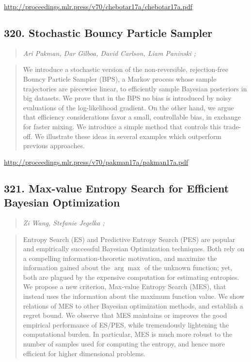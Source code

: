 \documentclass{article}
\begin{document}
\href{http://proceedings.mlr.press/v70/chebotar17a/chebotar17a.pdf}{http://proceedings.mlr.press/v70/chebotar17a/chebotar17a.pdf}

\subsection{320. Stochastic Bouncy Particle Sampler}

\begin{quote}
\footnotesize{\textit{Ari Pakman, Dar Gilboa, David Carlson, Liam Paninski ;}}

\end{quote}

\begin{quote}
    We introduce a stochastic version of the non-reversible, rejection-free Bouncy Particle Sampler (BPS), a Markov process whose sample trajectories are piecewise linear, to efficiently sample Bayesian posteriors in big datasets. We prove that in the BPS no bias is introduced by noisy evaluations of the log-likelihood gradient. On the other hand, we argue that efficiency considerations favor a small, controllable bias, in exchange for faster mixing. We introduce a simple method that controls this trade-off. We illustrate these ideas in several examples which outperform previous approaches.  
\end{quote}

\href{http://proceedings.mlr.press/v70/pakman17a/pakman17a.pdf}{http://proceedings.mlr.press/v70/pakman17a/pakman17a.pdf}

\subsection{321. Max-value Entropy Search for Efficient Bayesian Optimization}

\begin{quote}
\footnotesize{\textit{Zi Wang, Stefanie Jegelka ;}}

\end{quote}

\begin{quote}
    Entropy Search (ES) and Predictive Entropy Search (PES) are popular and empirically successful Bayesian Optimization techniques. Both rely on a compelling information-theoretic motivation, and maximize the information gained about the $\arg\max$ of the unknown function; yet, both are plagued by the expensive computation for estimating entropies. We propose a new criterion, Max-value Entropy Search (MES), that instead uses the information about the maximum function value. We show relations of MES to other Bayesian optimization methods, and establish a regret bound. We observe that MES maintains or improves the good empirical performance of ES/PES, while tremendously lightening the computational burden. In particular, MES is much more robust to the number of samples used for computing the entropy, and hence more efficient for higher dimensional problems.  
\end{quote}
\end{document}
